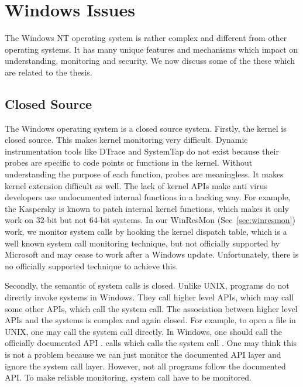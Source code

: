\section{Windows Issues}
\label{sec:bg-win}

The Windows NT operating system is rather complex and different from other
operating systems.
It has many unique features and mechanisms which impact on understanding,
monitoring and security.
We now discuss some of the these which are related to the thesis.

\subsection{Closed Source}

The Windows operating system is a closed source system.
Firstly, the kernel is closed source.
This makes kernel monitoring very difficult.
Dynamic instrumentation tools like DTrace and SystemTap do not exist because
their probes are specific to code points or functions in the kernel.
Without understanding the purpose of each function, probes are meaningless.
It makes kernel extension difficult as well.
The lack of kernel APIs make anti virus developers use undocumented internal
functions in a hacking way.
For example, the Kaspersky is known \cite{skywing2006avwrong} to patch internal
kernel functions, which makes it only work on 32-bit but not 64-bit systems.
In our WinResMon (Sec~\ref{sec:winresmon}) work, we monitor system calls
by hooking the kernel dispatch table, which is a well known
system call monitoring technique,
but not officially supported by Microsoft and may cease to work
after a Windows update.
Unfortunately, there is no officially supported technique to achieve this.

Secondly, the semantic of system calls is closed.
Unlike UNIX, programs do not directly invoke systems in Windows.
They call higher level APIs, which may call some other APIs, which call
the system call.
The association between higher level APIs and the systems is complex and
again closed.
For example, to open a file in UNIX, one may call the 
system call directly.
In Windows, one should call the officially documented API .
 calls  which calls
the system call .
One may think this is not a problem because we can just monitor the documented
API layer and ignore the system call layer.
However, not all programs follow the documented API.
To make reliable monitoring, system call have to be monitored.

